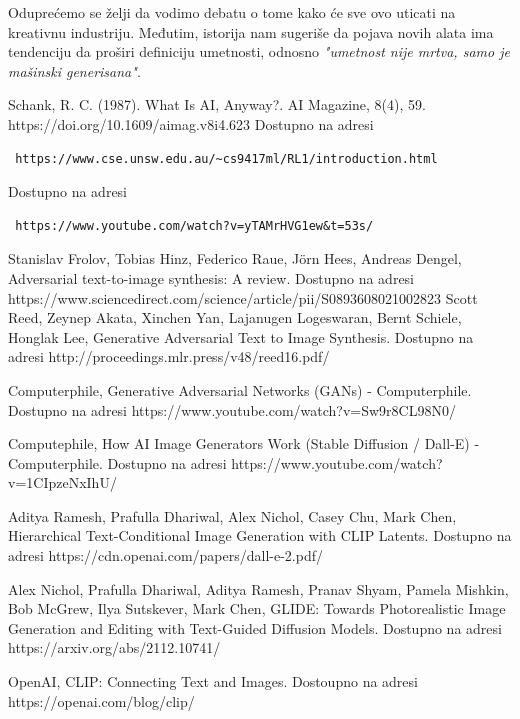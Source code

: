 \documentclass[12pt, letterpaper]{article}
\begin{document}
Oduprećemo se želji da vodimo debatu o tome kako će sve ovo uticati na kreativnu industriju. Međutim, istorija nam sugeriše da pojava novih alata ima tendenciju da proširi definiciju umetnosti, odnosno \textit{"umetnost nije mrtva, samo je mašinski generisana"}\cite{clanaknov}.

\pagebreak
\begin{thebibliography}{10}

 Schank, R. C. (1987). What Is AI, Anyway?. AI Magazine, 8(4), 59. https://doi.org/10.1609/aimag.v8i4.623  
 Dostupno na adresi\begin{verbatim} https://www.cse.unsw.edu.au/~cs9417ml/RL1/introduction.html \end{verbatim}  
 Dostupno na adresi\begin{verbatim} https://www.youtube.com/watch?v=yTAMrHVG1ew&t=53s/ \end{verbatim} 

 Stanislav Frolov, Tobias Hinz, Federico Raue, Jörn Hees, Andreas Dengel, Adversarial text-to-image synthesis: A review. Dostupno na adresi https://www.sciencedirect.com/science/article/pii/S0893608021002823
 Scott Reed, Zeynep Akata, Xinchen Yan, Lajanugen Logeswaran, Bernt Schiele, Honglak Lee, Generative Adversarial Text to Image Synthesis. Dostupno na adresi http://proceedings.mlr.press/v48/reed16.pdf/

 Computerphile, Generative Adversarial Networks (GANs) - Computerphile. Dostupno na adresi https://www.youtube.com/watch?v=Sw9r8CL98N0/

 Computephile, How AI Image Generators Work (Stable Diffusion / Dall-E) - Computerphile. Dostupno na adresi https://www.youtube.com/watch?v=1CIpzeNxIhU/

 Aditya Ramesh, Prafulla Dhariwal, Alex Nichol, Casey Chu, Mark Chen, Hierarchical Text-Conditional
Image Generation with CLIP Latents. Dostupno na adresi https://cdn.openai.com/papers/dall-e-2.pdf/

 Alex Nichol, Prafulla Dhariwal, Aditya Ramesh, Pranav Shyam, Pamela Mishkin, Bob McGrew, Ilya Sutskever, Mark Chen, GLIDE: Towards Photorealistic Image Generation and Editing with Text-Guided Diffusion Models. Dostupno na adresi https://arxiv.org/abs/2112.10741/

 OpenAI, CLIP: Connecting
Text and Images. Dostoupno na adresi https://openai.com/blog/clip/


\end{thebibliography}
\end{document}
